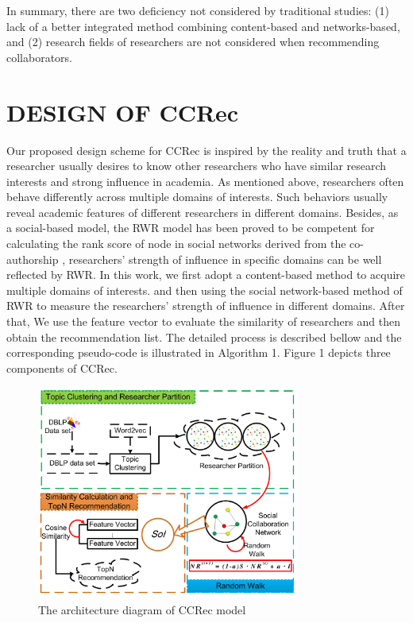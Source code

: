 \documentclass{acm_proc_article-sp}
\begin{document}
In summary, there are two deficiency not considered by traditional studies: (1) lack of a better integrated method combining content-based and networks-based, and (2) research fields of researchers are not considered when recommending collaborators.
\section{DESIGN OF CCRec}
Our proposed design scheme for CCRec is inspired by the reality and truth that a researcher usually desires to know other researchers who have similar research interests and strong influence in academia. As mentioned above, researchers often behave differently across multiple domains of interests. Such behaviors usually reveal academic features of different researchers in different domains. Besides, as a social-based model, the RWR model has been proved to be competent for calculating the rank score of node in social networks derived from the co-authorship \cite{li2014acrec}, researchers' strength of influence in specific domains can be well reflected by RWR. In this work, we first adopt a content-based method to acquire multiple domains of interests. and then using the social network-based method of RWR to measure the researchers' strength of influence in different domains. After that, We use the feature vector to evaluate the similarity of researchers and then obtain the recommendation list. The detailed process is described bellow and the corresponding pseudo-code is illustrated in Algorithm 1. Figure 1 depicts three components of CCRec.


\begin{figure}
\centering
\includegraphics [width=3.4in]{Fig1.pdf}
\caption{The architecture diagram of CCRec model}
\end{figure}
\end{document}
